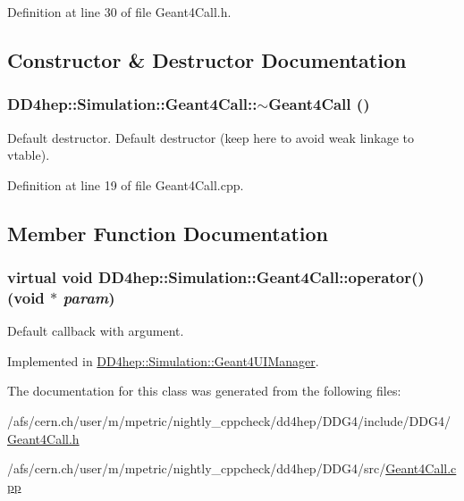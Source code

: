 Definition at line 30 of file Geant4Call.h.

\subsection{Constructor \& Destructor Documentation}
\hypertarget{class_d_d4hep_1_1_simulation_1_1_geant4_call_ae26b15b06c969e57c214235d31fa754f}{
\subsubsection[{$\sim$Geant4Call}]{\setlength{\rightskip}{0pt plus 5cm}DD4hep::Simulation::Geant4Call::$\sim$Geant4Call ()}}
\label{class_d_d4hep_1_1_simulation_1_1_geant4_call_ae26b15b06c969e57c214235d31fa754f}


Default destructor. Default destructor (keep here to avoid weak linkage to vtable). 

Definition at line 19 of file Geant4Call.cpp.

\subsection{Member Function Documentation}
\hypertarget{class_d_d4hep_1_1_simulation_1_1_geant4_call_ab55505a1c9fb5e928c995d1312d4158e}{
\subsubsection[{operator()}]{\setlength{\rightskip}{0pt plus 5cm}virtual void DD4hep::Simulation::Geant4Call::operator() (void $\ast$ {\em param})}}
\label{class_d_d4hep_1_1_simulation_1_1_geant4_call_ab55505a1c9fb5e928c995d1312d4158e}


Default callback with argument. 

Implemented in \hyperlink{class_d_d4hep_1_1_simulation_1_1_geant4_u_i_manager_a3b883391f9b66b1620c0ba44406b3247}{DD4hep::Simulation::Geant4UIManager}.

The documentation for this class was generated from the following files:\begin{DoxyCompactItemize}
\item 
/afs/cern.ch/user/m/mpetric/nightly\_\-cppcheck/dd4hep/DDG4/include/DDG4/\hyperlink{_geant4_call_8h}{Geant4Call.h}\item 
/afs/cern.ch/user/m/mpetric/nightly\_\-cppcheck/dd4hep/DDG4/src/\hyperlink{_geant4_call_8cpp}{Geant4Call.cpp}\end{DoxyCompactItemize}
